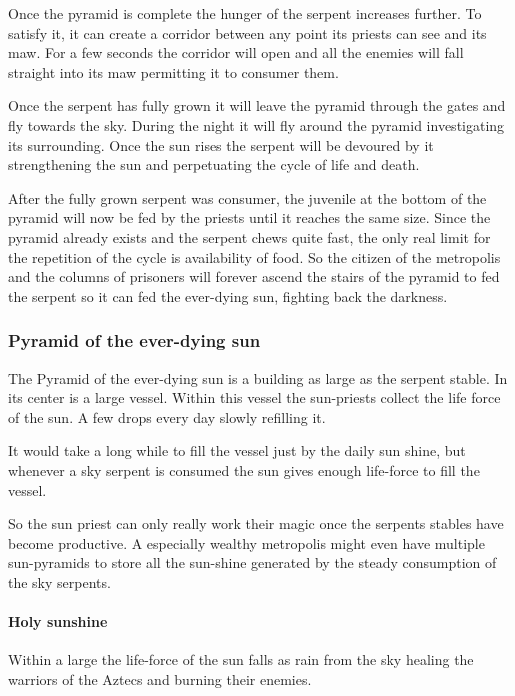 \documentclass[a4paper]{book}
\begin{document}
				Once the pyramid is complete the hunger of the serpent increases further.
				To satisfy it, it can create a corridor between any point its priests can see
				and its maw.
				For a few seconds the corridor will open and all the enemies will fall straight into
				its maw permitting it to consumer them.

				Once the serpent has fully grown it will leave the pyramid through the gates and fly towards the sky.
				During the night it will fly around the pyramid investigating its surrounding.
				Once the sun rises the serpent will be devoured by it strengthening the sun and perpetuating the cycle
				of life and death.

				After the fully grown serpent was consumer,
				the juvenile at the bottom of the pyramid will now be fed by the priests until it reaches the same size.
				Since the pyramid already exists and the serpent chews quite fast,
				the only real limit for the repetition of the cycle is availability of food.
				So the citizen of the metropolis and the columns of prisoners will forever ascend the stairs
				of the pyramid to fed the serpent so it can fed the ever-dying sun,
				fighting back the darkness.

		\subsubsection{Pyramid of the ever-dying sun}
			The Pyramid of the ever-dying sun is a building as large as the serpent stable.
			In its center is a large vessel.
			Within this vessel the sun-priests collect the life force of the sun.
			A few drops every day slowly refilling it.

			It would take a long while to fill the vessel just by the daily sun shine,
			but whenever a sky serpent is consumed the sun gives enough life-force
			to fill the vessel.

			So the sun priest can only really work their magic once the serpents stables
			have become productive.
			A especially wealthy metropolis might even have multiple sun-pyramids
			to store all the sun-shine generated by the steady consumption of the sky serpents.

			\paragraph{Holy sunshine}
				Within a large the life-force of the sun falls as rain from the sky healing
				the warriors of the \gls{Aztecs} and burning their enemies.
\end{document}
